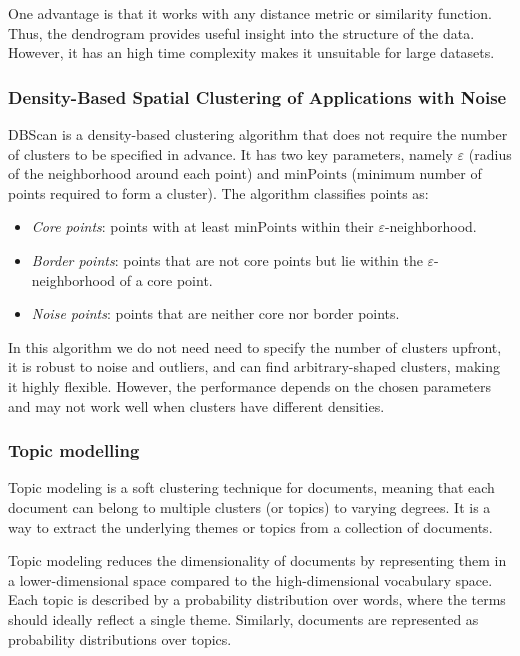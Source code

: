One advantage is that it works with any distance metric or similarity function.
Thus, the dendrogram provides useful insight into the structure of the data.
However, it has an high time complexity makes it unsuitable for large datasets.

\subsubsection{Density-Based Spatial Clustering of Applications with Noise}
DBScan is a density-based clustering algorithm that does not require the number of clusters to be specified in advance.
It has two key parameters, namely $\varepsilon$ (radius of the neighborhood around each point) and $\text{minPoints}$ (minimum number of points required to form a cluster). 
The algorithm classifies points as: 
\begin{itemize}
    \item \textit{Core points}: points with at least $\text{minPoints}$ within their $\varepsilon$-neighborhood.
    \item \textit{Border points}: points that are not core points but lie within the $\varepsilon$-neighborhood of a core point.
    \item \textit{Noise points}: points that are neither core nor border points.
\end{itemize}
\noindent In this algorithm we do not need need to specify the number of clusters upfront, it is robust to noise and outliers, and can find arbitrary-shaped clusters, making it highly flexible.
However, the performance depends on the chosen parameters and may not work well when clusters have different densities.

\subsubsection{Topic modelling}
Topic modeling is a soft clustering technique for documents, meaning that each document can belong to multiple clusters (or topics) to varying degrees. 
It is a way to extract the underlying themes or topics from a collection of documents.

Topic modeling reduces the dimensionality of documents by representing them in a lower-dimensional space compared to the high-dimensional vocabulary space.
Each topic is described by a probability distribution over words, where the terms should ideally reflect a single theme. 
Similarly, documents are represented as probability distributions over topics.

